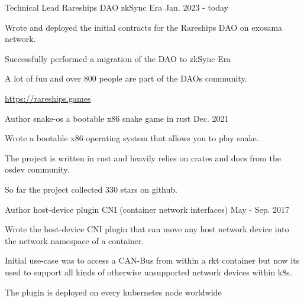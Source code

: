 


\begin{cventries}


\cventry
{Technical Lead} %
{Rareships DAO} %
{zkSync Era} %
{Jan. 2023 - today} %
{ %
\begin{cvitems}
\item {Wrote and deployed the initial contracts for the Rareships DAO on exosama network.}
\item {Successfully performed a migration of the DAO to zkSync Era}
\item {A lot of fun and over 800 people are part of the DAOs community.}
\item {\url{https://rareships.games}}
\end{cvitems}
}%


\cventry
{Author} %
{snake-os} %
{a bootable x86 snake game in rust} %
{Dec. 2021} %
{ %
\begin{cvitems}
\item {Wrote a bootable x86 operating system that allows you to play snake.}
\item {The project is written in rust and heavily relies on crates and docs from the osdev community.}
\item {So far the project collected 330 stars on github.}
\end{cvitems}
}%

\cventry
{Author} %
{host-device plugin} %
{CNI (container network interfaces)} %
{May - Sep. 2017} %
{ %
\begin{cvitems}
\item {Wrote the host-device CNI plugin that can move any host network device into the network namespace of a container.}
\item {Initial use-case was to access a CAN-Bus from within a rkt container but now its used to support all kinds of otherwise unsupported network devices within k8s.}
\item {The plugin is deployed on every kubernetes node worldwide}
\end{cvitems}
}


\end{cventries}
